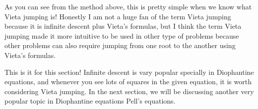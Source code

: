 \documentclass[../../../main.tex]{subfiles}
\begin{document}
As you can see from the method above, this is pretty simple when
we know what Vieta jumping is! Honestly I am not a huge fan of
the term Vieta jumping because it is infinite descent plus
Vieta's formulas, but I think the term Vieta jumping made it
more intuitive to be used in other type of problems because other
problems can also require jumping from one root to the another
using Vieta's formulas.

This is it for this section! Infinite descent is vary popular
specially in Diophantine equations, and whenever you see
lots of squares in the given equation, it is worth considering
Vieta jumping. In the next section, we will be discussing another
very popular topic in Diophantine equations Pell's equations.
\end{document}
